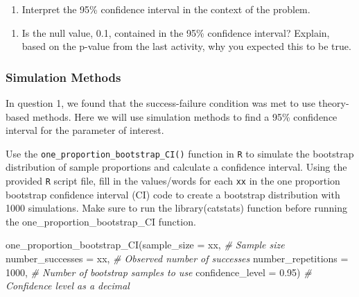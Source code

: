 \documentclass[
]{report}
\newenvironment{Shaded}{\begin{snugshade}}{\end{snugshade}}
\newcommand{\AttributeTok}[1]{\textcolor[rgb]{0.77,0.63,0.00}{#1}}
\newcommand{\CommentTok}[1]{\textcolor[rgb]{0.56,0.35,0.01}{\textit{#1}}}
\newcommand{\DecValTok}[1]{\textcolor[rgb]{0.00,0.00,0.81}{#1}}
\newcommand{\FloatTok}[1]{\textcolor[rgb]{0.00,0.00,0.81}{#1}}
\newcommand{\FunctionTok}[1]{\textcolor[rgb]{0.00,0.00,0.00}{#1}}
\newcommand{\NormalTok}[1]{#1}
\providecommand{\tightlist}{%
  \setlength{\itemsep}{0pt}\setlength{\parskip}{0pt}}
\begin{document}
\begin{enumerate}
\def\labelenumi{\arabic{enumi}.}
\setcounter{enumi}{7}
\tightlist
\item
  Interpret the 95\% confidence interval in the context of the problem.
\end{enumerate}

\vspace{1in}

\begin{enumerate}
\def\labelenumi{\arabic{enumi}.}
\setcounter{enumi}{8}
\tightlist
\item
  Is the null value, 0.1, contained in the 95\% confidence interval? Explain, based on the p-value from the last activity, why you expected this to be true.
  \vspace{1in}
\end{enumerate}

\hypertarget{simulation-methods}{%
\subsubsection*{Simulation Methods}\label{simulation-methods}}

In question 1, we found that the success-failure condition was met to use theory-based methods. Here we will use simulation methods to find a 95\% confidence interval for the parameter of interest.

Use the \texttt{one\_proportion\_bootstrap\_CI()} function in \texttt{R} to simulate the bootstrap distribution of sample proportions and calculate a confidence interval. Using the provided \texttt{R} script file, fill in the values/words for each \texttt{xx} in the one proportion bootstrap confidence interval (CI) code to create a bootstrap distribution with 1000 simulations. Make sure to run the library(catstats) function before running the one\_proportion\_bootstrap\_CI function.

\begin{Shaded}
\begin{Highlighting}[]
\FunctionTok{one\_proportion\_bootstrap\_CI}\NormalTok{(}\AttributeTok{sample\_size =}\NormalTok{ xx, }\CommentTok{\# Sample size}
                    \AttributeTok{number\_successes =}\NormalTok{ xx, }\CommentTok{\# Observed number of successes}
                    \AttributeTok{number\_repetitions =} \DecValTok{1000}\NormalTok{, }\CommentTok{\# Number of bootstrap samples to use}
                    \AttributeTok{confidence\_level =} \FloatTok{0.95}\NormalTok{) }\CommentTok{\# Confidence level as a decimal}
\end{Highlighting}
\end{Shaded}
\end{document}
